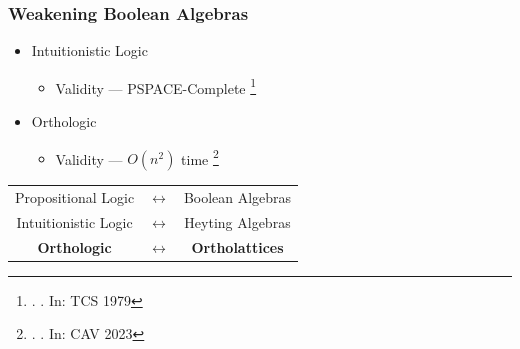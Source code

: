 \documentclass[
    aspectratio=169,
    xcolor={dvipsnames},
]{beamer}
\begin{document}
\begin{frame}
    \frametitle{Weakening Boolean Algebras}




    \begin{itemize}[<+->]
        \item Intuitionistic Logic
        \begin{itemize}
            \item Validity --- PSPACE-Complete
            \footnote<2->{. \emph{}. In: TCS 1979}
        \end{itemize}
        \item Orthologic
        \begin{itemize}
            \item Validity --- \(O(n^2)\) time
            \footnote<4->{. \emph{}. In: CAV 2023}
        \end{itemize}
    \end{itemize}

    \pause 

    \begin{center}
        \begin{tabular}{c c c}
            Propositional Logic & \(\leftrightarrow\) & Boolean Algebras \\
            Intuitionistic Logic & \(\leftrightarrow\) & Heyting Algebras \\
            \textbf{Orthologic} & \(\leftrightarrow\) & \textbf{Ortholattices}
        \end{tabular}
    \end{center}

\end{frame}
\end{document}
